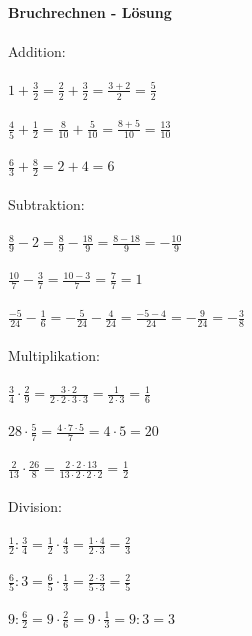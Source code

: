 


  \textbf{Bruchrechnen -  Lösung}\\\\
  Addition:\\\\
  $1+\frac{3}{2}=\frac{2}{2}+\frac{3}{2}=\frac{3+2}{2}=\frac{5}{2}$\\\\
  $\frac{4}{5}+\frac{1}{2}=\frac{8}{10}+\frac{5}{10}=\frac{8+5}{10}=\frac{13}{10}$\\\\
  $\frac{6}{3}+\frac{8}{2}=2+4=6$\\\\

  \noindent Subtraktion:\\\\
  $\frac{8}{9}-2=\frac{8}{9}-\frac{18}{9}=\frac{8-18}{9}=-\frac{10}{9}$\\\\
  $\frac{10}{7}-\frac{3}{7}=\frac{10-3}{7}=\frac{7}{7}=1$\\\\
  $\frac{-5}{24}-\frac{1}{6}=-\frac{5}{24}-\frac{4}{24}=\frac{-5-4}{24}=-\frac{9}{24}=-\frac{3}{8}$\\\\

  \noindent Multiplikation:\\\\
  $\frac{3}{4}\cdot\frac{2}{9}=\frac{3\cdot2}{2\cdot2\cdot3\cdot3}=\frac{1}{2\cdot3}=\frac{1}{6}$\\\\
  $28\cdot\frac{5}{7}=\frac{4\cdot7\cdot5}{7}=4\cdot5=20$\\\\
  $\frac{2}{13}\cdot\frac{26}{8}=\frac{2\cdot2\cdot13}{13\cdot2\cdot2\cdot2}=\frac{1}{2}$\\\\

  \noindent Division:\\\\
  $\frac{1}{2}:\frac{3}{4}=\frac{1}{2}\cdot\frac{4}{3}=\frac{1\cdot4}{2\cdot3}=\frac{2}{3}$\\\\
  $\frac{6}{5}:3=\frac{6}{5}\cdot\frac{1}{3}=\frac{2\cdot3}{5\cdot3}=\frac{2}{5}$\\\\
  $9:\frac{6}{2}=9\cdot\frac{2}{6}=9\cdot\frac{1}{3}=9:3=3$\\\\

